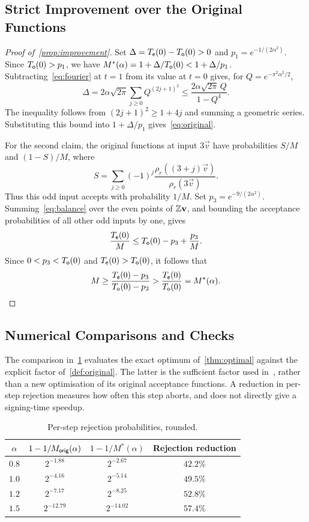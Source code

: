 \subsection{Strict Improvement over the Original Functions}

\begin{proof}[Proof of~\cref{prop:improvement}]
Set $\Delta=T_{\mathsf e}(0)-T_{\mathsf o}(0)>0$ and $p_1=e^{-1/(2\alpha^2)}$. Since $T_{\mathsf o}(0)>p_1$, we have $M^*(\alpha)=1+\Delta/T_{\mathsf o}(0)<1+\Delta/p_1$. Subtracting~\cref{eq:fourier} at $t=1$ from its value at $t=0$ gives, for $Q=e^{-\pi^2\alpha^2/2}$,
\[
 \Delta=2\alpha\sqrt{2\pi}\sum_{j\ge0}Q^{(2j+1)^2}
 \le\frac{2\alpha\sqrt{2\pi}\,Q}{1-Q^4}.
\]
The inequality follows from $(2j+1)^2\ge1+4j$ and summing a geometric series. Substituting this bound into $1+\Delta/p_1$ gives~\cref{eq:original}.

For the second claim, the original functions at input $3\vec v$ have probabilities $S/M$ and $(1-S)/M$, where
\[
 S=\sum_{j\ge0}(-1)^j\frac{\rho_r((3+j)\vec v)}{\rho_r(3\vec v)}.
\]
Thus this odd input accepts with probability $1/M$. Set $p_3=e^{-9/(2\alpha^2)}$. Summing~\cref{eq:balance} over the even points of $\mathbb{Z}\mathbf{v}$, and bounding the acceptance probabilities of all other odd inputs by one, gives
\[
 \frac{T_{\mathsf e}(0)}M\le T_{\mathsf o}(0)-p_3+\frac{p_3}M.
\]
Since $0<p_3<T_{\mathsf o}(0)$ and $T_{\mathsf e}(0)>T_{\mathsf o}(0)$, it follows that
\[
 M\ge\frac{T_{\mathsf e}(0)-p_3}{T_{\mathsf o}(0)-p_3}>\frac{T_{\mathsf e}(0)}{T_{\mathsf o}(0)}=M^*(\alpha).
\]
\end{proof}

\subsection{Numerical Comparisons and Checks}

The comparison in~\cref{tab:rates} evaluates the exact optimum of~\cref{thm:optimal} against the explicit factor of~\cref{def:original}. The latter is the sufficient factor used in~\cite{GartnerFull}, rather than a new optimisation of its original acceptance functions. A reduction in per-step rejection measures how often this step aborts, and does not directly give a signing-time speedup.

\begin{table}[H]
\centering
\begin{tabular}{cccc}
\toprule
$\alpha$ & $1-1/M_{\mathsf{orig}}(\alpha)$ & $1-1/M^*(\alpha)$ & Rejection reduction\\
\midrule
$0.8$ & $2^{-1.88}$ & $2^{-2.67}$ & $42.2\%$\\
$1.0$ & $2^{-4.16}$ & $2^{-5.14}$ & $49.5\%$\\
$1.2$ & $2^{-7.17}$ & $2^{-8.25}$ & $52.8\%$\\
$1.5$ & $2^{-12.79}$ & $2^{-14.02}$ & $57.4\%$\\
\bottomrule
\end{tabular}
\caption{Per-step rejection probabilities, rounded.}
\label{tab:rates}
\end{table}

